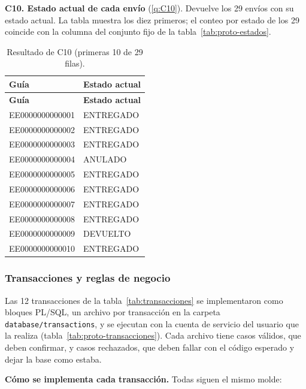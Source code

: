 \textbf{C10. Estado actual de cada envío} (\ref{q:C10}). Devuelve los 29
envíos con su estado actual. La tabla muestra los diez primeros; el
conteo por estado de los 29 coincide con la columna del conjunto fijo de la
tabla~\ref{tab:proto-estados}.

{\singlespacing\small
\begin{longtable}{L{3.6cm} L{3.2cm}}
\caption{Resultado de C10 (primeras 10 de 29 filas).}
\label{tab:proto-c10}\\
\toprule
\textbf{Guía} & \textbf{Estado actual} \\
\midrule
\endfirsthead
\toprule
\textbf{Guía} & \textbf{Estado actual} \\
\midrule
\endhead
\bottomrule
\endfoot
EE0000000000001 & ENTREGADO \\
EE0000000000002 & ENTREGADO \\
EE0000000000003 & ENTREGADO \\
EE0000000000004 & ANULADO \\
EE0000000000005 & ENTREGADO \\
EE0000000000006 & ENTREGADO \\
EE0000000000007 & ENTREGADO \\
EE0000000000008 & ENTREGADO \\
EE0000000000009 & DEVUELTO \\
EE0000000000010 & ENTREGADO \\
\end{longtable}
\par}


\subsubsection{Transacciones y reglas de negocio}
\label{sec:proto-transacciones}

Las 12 transacciones de la tabla~\ref{tab:transacciones} se implementaron
como bloques PL/SQL, un archivo por transacción en la carpeta
\texttt{database/}\allowbreak\texttt{transactions}, y se ejecutan con la cuenta de servicio del usuario que la
realiza (tabla~\ref{tab:proto-transacciones}). Cada archivo tiene casos
válidos, que deben confirmar, y casos rechazados, que deben fallar con
el código esperado y dejar la base como estaba.

\textbf{Cómo se implementa cada transacción.} Todas siguen el mismo
molde:

